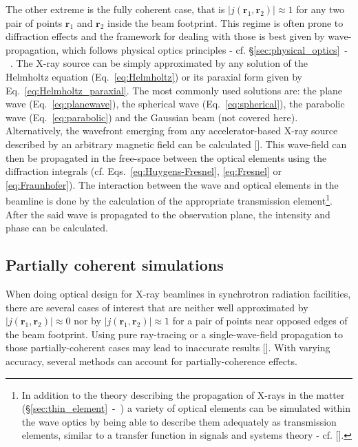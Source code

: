 \begin{refsection}
The other extreme is the fully coherent case, that is $|j(\textbf{r}_1,\textbf{r}_2)|\approx1$ for any two pair of points $\textbf{r}_1$ and $\textbf{r}_2$ inside the beam footprint. This regime is often prone to diffraction effects and the framework for dealing with those is best given by wave-propagation, which follows physical optics principles - cf. §\ref{sec:physical_optics}~-~\textit{}. The X-ray source can be simply approximated by any solution of the Helmholtz equation (Eq.~\ref{eq:Helmholtz}) or its paraxial form given by Eq.~\ref{eq:Helmholtz_paraxial}. The most commonly used solutions are: the plane wave (Eq.~\ref{eq:planewave}), the spherical wave (Eq.~\ref{eq:spherical}), the parabolic wave (Eq.~\ref{eq:parabolic}) and the Gaussian beam (not covered here). Alternatively, the wavefront emerging from any accelerator-based X-ray source described by an arbitrary magnetic field can be calculated [\cite{Chubar1995, Chubar2001}]. This wave-field can then be propagated in the free-space between the optical elements using the diffraction integrals (cf. Eqs.~\ref{eq:Huygens-Fresnel},  \ref{eq:Fresnel} or \ref{eq:Fraunhofer}). The interaction between the wave and optical elements in the beamline is done by the calculation of the appropriate transmission element\footnote{In addition to the theory describing the propagation of X-rays in the matter (§\ref{sec:thin_element}~-~\textit{}) a variety of optical elements can be simulated within the wave optics by being able to describe them adequately as transmission elements, similar to a transfer function in signals and systems theory - cf. [\cite{Canestrari2014, Li2017}].}. After the said wave is propagated to the observation plane, the intensity and phase can be calculated. 

\subsection{Partially coherent simulations}\label{sec:partially_coherent}

When doing optical design for X-ray beamlines in synchrotron radiation facilities, there are several cases of interest that are neither well approximated by $|j(\textbf{r}_1,\textbf{r}_2)|\approx0$ nor by $|j(\textbf{r}_1,\textbf{r}_2)|\approx1$ for a pair of points near opposed edges of the beam footprint. Using pure ray-tracing or a single-wave-field propagation to those partially-coherent cases may lead to inaccurate results [\cite{SanchezdelRio2019}]. With varying accuracy, several methods can account for  partially-coherence effects.


\end{refsection}
